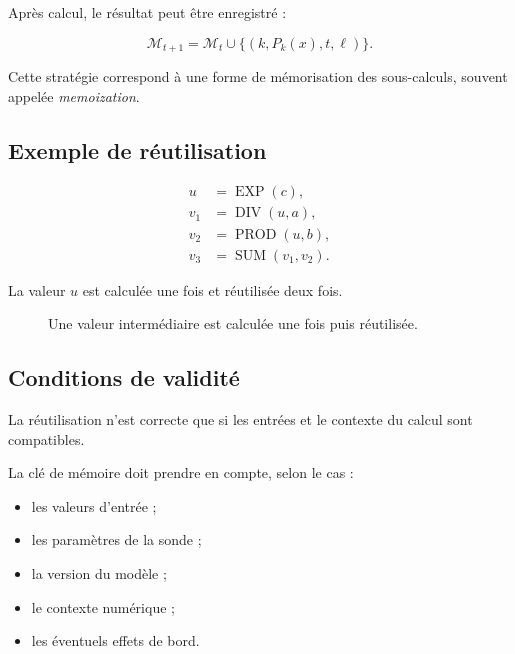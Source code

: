 \documentclass[11pt,a4paper]{article}
\begin{document}
Après calcul, le résultat peut être enregistré :

\[
\mathcal{M}_{t+1}
=
\mathcal{M}_t
\cup
\{(k,P_k(x),t,\ell)\}.
\]

Cette stratégie correspond à une forme de mémorisation des
sous-calculs, souvent appelée \textit{memoization}.

\subsection{Exemple de réutilisation}

\[
\begin{aligned}
u &= \operatorname{EXP}(c),\\
v_1 &= \operatorname{DIV}(u,a),\\
v_2 &= \operatorname{PROD}(u,b),\\
v_3 &= \operatorname{SUM}(v_1,v_2).
\end{aligned}
\]

La valeur $u$ est calculée une fois et réutilisée deux fois.

\begin{figure}[H]
\centering
{}
\caption{Une valeur intermédiaire est calculée une fois puis réutilisée.}
\end{figure}

\subsection{Conditions de validité}

La réutilisation n'est correcte que si les entrées et le contexte
du calcul sont compatibles.

La clé de mémoire doit prendre en compte, selon le cas :
\begin{itemize}
  \item les valeurs d'entrée ;
  \item les paramètres de la sonde ;
  \item la version du modèle ;
  \item le contexte numérique ;
  \item les éventuels effets de bord.
\end{itemize}
\end{document}
